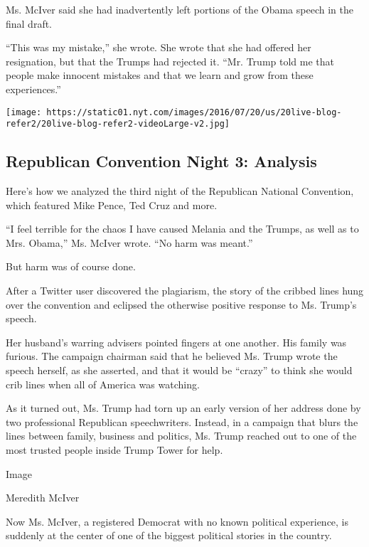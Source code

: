 Ms. McIver said she had inadvertently left portions of the Obama speech
in the final draft.

``This was my mistake,'' she wrote. She wrote that she had offered her
resignation, but that the Trumps had rejected it. ``Mr. Trump told me
that people make innocent mistakes and that we learn and grow from these
experiences.''

\href{https://www.nytimes.com/interactive/2016/07/20/us/elections/gop-convention-speakers.html}{}

\texttt{[image: https://static01.nyt.com/images/2016/07/20/us/20live-blog-refer2/20live-blog-refer2-videoLarge-v2.jpg]}

\hypertarget{republican-convention-night-3-analysis}{%
\subsection{Republican Convention Night 3:
Analysis}\label{republican-convention-night-3-analysis}}

Here's how we analyzed the third night of the Republican National
Convention, which featured Mike Pence, Ted Cruz and more.

``I feel terrible for the chaos I have caused Melania and the Trumps, as
well as to Mrs. Obama,'' Ms. McIver wrote. ``No harm was meant.''

But harm was of course done.

After a Twitter user discovered the plagiarism, the story of the cribbed
lines hung over the convention and eclipsed the otherwise positive
response to Ms. Trump's speech.

Her husband's warring advisers pointed fingers at one another. His
family was furious. The campaign chairman said that he believed Ms.
Trump wrote the speech herself, as she asserted, and that it would be
``crazy'' to think she would crib lines when all of America was
watching.

As it turned out, Ms. Trump had torn up an early version of her address
done by two professional Republican speechwriters. Instead, in a
campaign that blurs the lines between family, business and politics, Ms.
Trump reached out to one of the most trusted people inside Trump Tower
for help.

Image

Meredith McIver

Now Ms. McIver, a registered Democrat with no known political
experience, is suddenly at the center of one of the biggest political
stories in the country.

